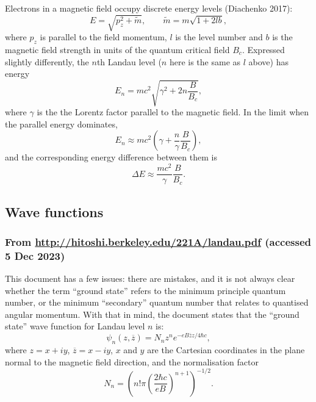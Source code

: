 \documentclass{book}
\begin{document}
Electrons in a magnetic field occupy discrete energy levels (Diachenko 2017):
\begin{equation}
    E = \sqrt{p_z^2 + \tilde{m}},
    \qquad
    \tilde{m} = m\sqrt{1 + 2lb},
\end{equation}
where $p_z$ is parallel to the field momentum, $l$ is the level number and $b$ is the magnetic field strength in units of the quantum critical field $B_c$.
Expressed slightly differently, the $n$th Landau level ($n$ here is the same as $l$ above) has energy
\begin{equation}
    E_n = mc^2\sqrt{\gamma^2 + 2n\frac{B}{B_c}},
\end{equation}
where $\gamma$ is the the Lorentz factor parallel to the magnetic field.
In the limit when the parallel energy dominates,
\begin{equation}
    E_n \approx mc^2\left(\gamma + \frac{n}{\gamma}\frac{B}{B_c}\right),
\end{equation}
and the corresponding energy difference between them is
\begin{equation}
    \Delta E \approx \frac{mc^2}{\gamma} \frac{B}{B_c}.
\end{equation}

\subsection{Wave functions}

\subsubsection{From \url{http://hitoshi.berkeley.edu/221A/landau.pdf} (accessed 5 Dec 2023)}

This document has a few issues: there are mistakes, and it is not always clear whether the term ``ground state'' refers to the minimum principle quantum number, or the minimum ``secondary'' quantum number that relates to quantised angular momentum.
With that in mind, the document states that the ``ground state'' wave function for Landau level $n$ is:
\begin{equation}
    \psi_n(z, \overline{z}) = N_n z^n e^{-eB\overline{z}z/4\hbar c},
\end{equation}
where $z = x + iy$, $\overline{z} = x - iy$, $x$ and $y$ are the Cartesian coordinates in the plane normal to the magnetic field direction, and the normalisation factor
\begin{equation}
    N_n = \left(n! \pi \left(\frac{2\hbar c}{eB}\right)^{n+1}\right)^{-1/2}.
\end{equation}
\end{document}
